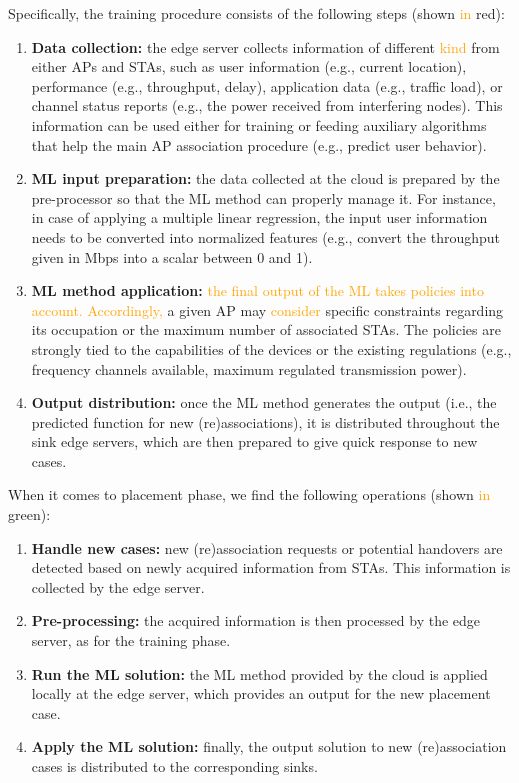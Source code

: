 \documentclass[journal]{IEEEtran}
\begin{document}
Specifically, the training procedure consists of the following steps (shown \textcolor{orange}{in} red):
\begin{enumerate}
	\item \textbf{Data collection:} the edge server collects information of different \textcolor{orange}{kind} from either APs and STAs, such as user information (e.g., current location), performance (e.g., throughput, delay), application data (e.g., traffic load), or channel status reports (e.g., the power received from interfering nodes). This information can be used either for training or feeding auxiliary algorithms that help the main AP association procedure (e.g., predict user behavior).
	\item \textbf{ML input preparation:} the data collected at the cloud is prepared by the pre-processor so that the ML method can properly manage it. For instance, in case of applying a multiple linear regression, the input user information needs to be converted into normalized features (e.g., convert the throughput given in Mbps into a scalar between 0 and 1).
	\item \textbf{ML method application:} \textcolor{orange}{the final output of the ML takes policies into account. Accordingly,} a given AP may \textcolor{orange}{consider} specific constraints regarding its occupation or the maximum number of associated STAs. The policies are strongly tied to the capabilities of the devices or the existing regulations (e.g., frequency channels available, maximum regulated transmission power).
	\item \textbf{Output distribution:} once the ML method generates the output (i.e., the predicted function for new (re)associations), it is distributed throughout the sink edge servers, which are then prepared to give quick response to new cases.
\end{enumerate}

When it comes to placement phase, we find the following operations (shown \textcolor{orange}{in} green):
\begin{enumerate}
	\item \textbf{Handle new cases:} new (re)association requests or potential handovers are detected based on newly acquired information from STAs. This information is collected by the edge server.
	\item \textbf{Pre-processing:} the acquired information is then processed by the edge server, as for the training phase.
	\item \textbf{Run the ML solution:} the ML method provided by the cloud is applied locally at the edge server, which provides an output for the new placement case.
	\item \textbf{Apply the ML solution:} finally, the output solution to new (re)association cases is distributed to the corresponding sinks.
\end{enumerate}
\end{document}
